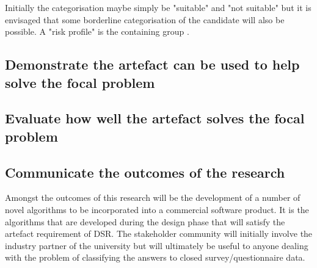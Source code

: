 Initially the categorisation maybe simply be "suitable" and
"not suitable" but it is envisaged that some borderline categorisation of the candidate will also be
possible. A "risk profile" is the containing group .


\subsection{Demonstrate the artefact can be used to help solve the focal problem}
\subsection{Evaluate how well the artefact solves the focal problem}
\subsection{Communicate the outcomes of the research}






Amongst the outcomes of this research will be the development of a number of novel algorithms to be incorporated into a commercial software product. It is the algorithms that are developed during the design phase that will satisfy the artefact requirement of DSR. The stakeholder community will initially involve the industry partner of the university but will ultimately be useful to anyone dealing with the problem of classifying the answers to closed survey/questionnaire data.




